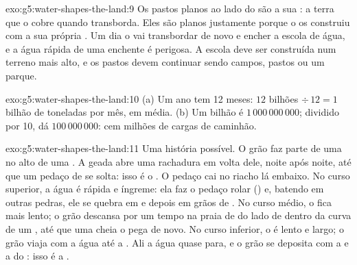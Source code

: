 \begin{solution}{exo:g5:water-shapes-the-land:9}
Os pastos planos ao lado do  são a sua : a terra
que o  cobre quando transborda. Eles são planos justamente porque o
 os construiu com a sua própria . Um dia o  vai transbordar de
novo e encher a escola de água, e a água rápida de uma enchente é
perigosa. A escola deve ser construída num terreno mais alto, e os pastos
devem continuar sendo campos, pastos ou um parque.
\end{solution}

\begin{solution}{exo:g5:water-shapes-the-land:10}
(a) Um ano tem 12 meses: $12$ bilhões $\div\, 12 = 1$ bilhão de toneladas
por mês, em média. (b) Um bilhão é $1\,000\,000\,000$; dividido por 10, dá
$100\,000\,000$: cem milhões de cargas de caminhão.
\end{solution}

\begin{solution}{exo:g5:water-shapes-the-land:11}
Uma história possível. O grão faz parte de uma  no alto de uma
. A geada abre uma rachadura em volta dele, noite após noite, até
que um pedaço de  se solta: isso é o . O pedaço cai no
riacho lá embaixo. No curso superior, a água é rápida e íngreme: ela faz o
pedaço rolar () e, batendo em outras pedras, ele se quebra em 
e depois em grãos de . No curso médio, o  fica mais lento; o grão
descansa por um tempo na praia de  do lado de dentro da curva de um
, até que uma cheia o pega de novo. No curso inferior, o  é
lento e largo; o grão viaja com a água até a . Ali a água quase para,
e o grão se deposita com a  e a  do : isso é a .
\end{solution}
